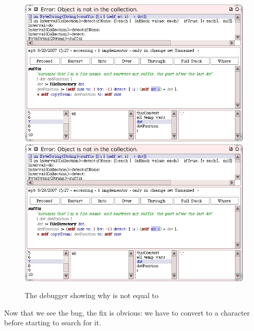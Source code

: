 \documentclass[a4paper,10pt,twoside]{book}
\begin{document}
\begin{figure}[btp]
	\begin{center}
	\ifluluelse
		{\includegraphics[width=\textwidth]{dotIsAString}}
		{\includegraphics[scale=0.7]{dotIsAString}}
	\end{center}
	\caption{The debugger showing why  is not equal to }
	\label{fig:dotIsAString}
\end{figure}

Now that we see the bug, the fix is obvious: we have to convert  to a character before starting to search for it.  
\end{document}
